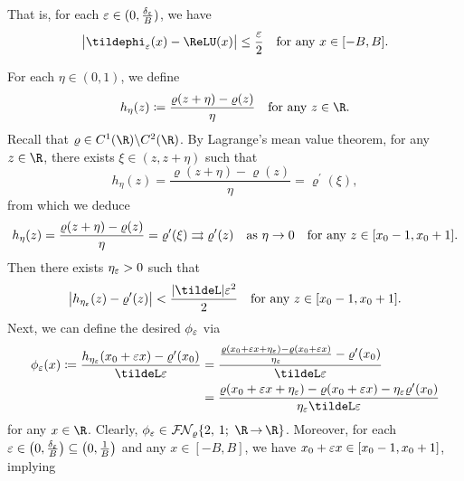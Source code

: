 \documentclass[11pt,a4paper]{article}
\begin{document}
That is, for each $\varepsilon\in (0,\frac{\delta_\varepsilon}{B})$, we have 
\begin{equation}
\label{eq:tildephieps:minus:ReLU}
	\begin{split}
    \big|\tildephi_\eps(x)-\ReLU(x)\big|
   \le \frac{\eps}{2}\quad \tn{for any $x\in [-B, B]$.}
	\end{split}
\end{equation}


For each $\eta\in (0,1)$, we define
\begin{equation*}
	h_\eta(z)\coloneqq\frac{\varrho (z+\eta)-\varrho (z) }{\eta}\quad \tn{for any $z\in\R$.}
\end{equation*}
Recall that  $\varrho\in C^1(\R)\backslash C^{2}(\R)$.
By Lagrange's mean value theorem, for any $z\in\R$, there exists
$\xi\in (z,z+\eta)$  such that 
\begin{equation*}
	h_\eta(z)= \frac{\varrho (z+\eta)-\varrho (z) }{\eta}=\varrho^\prime(\xi),
\end{equation*}
from which we deduce
\begin{equation*}
	h_\eta(z)= \frac{\varrho (z+\eta)-\varrho (z) }{\eta}=\varrho^\prime(\xi)
	\rightrightarrows \varrho^{\prime}(z)\quad\textnormal{as}\  \eta\to0\quad \textnormal{for any $z\in [x_0-1,x_0+1]$.}
\end{equation*}
Then there exists $\eta_\varepsilon>0$ such that
\begin{equation*}
	\big|	h_{\eta_\eps}(z) - \varrho^{\prime}(z)\big|<\frac{|\tildeL|\eps^2}{2}\quad \tn{for any $z\in [x_0-1,x_0+1]$.}
\end{equation*}				
Next, we can define the desired $\phi_\varepsilon$ via
\begin{equation*}
	\begin{split}
		\phi_{\eps}(x)\coloneqq
		 \frac{h_{\eta_\eps}(x_0+\eps x)-\varrho^{\prime}(x_0)}{\tildeL\eps}
         &=\frac{ \frac{\varrho(x_0+\eps x+ \eta_\eps) -\varrho(x_0+\eps x)}{\eta_\eps} -\varrho^{\prime}(x_0)}{\tildeL\eps}
		\\& =\frac{  \varrho(x_0+\eps x+ \eta_\eps) -\varrho(x_0+\eps x) -{\eta_\eps}\varrho^{\prime}(x_0)}{{\eta_\eps}\tildeL\eps}
	\end{split}
\end{equation*}	
for any $x\in \R$. Clearly, $\phi_\eps\in \nn{\varrho}{2}{1}{\R}{\R}$. Moreover, for each $\varepsilon\in \big(0,\tfrac{\delta_\varepsilon}{B}\big)\subseteq \big(0,\tfrac{1}{B}\big)$ and any $x\in [-B,B]$, we have $x_0+\varepsilon  x \in [x_0-1,x_0+1]$, implying
\end{document}
